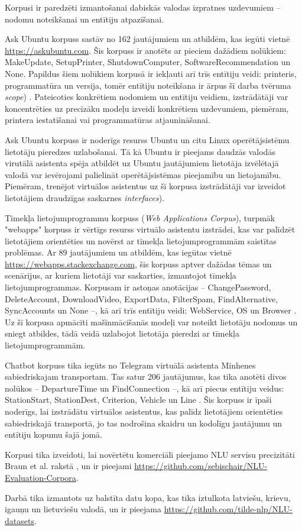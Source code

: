 Korpusi ir paredzēti izmantošanai dabiskās valodas izpratnes uzdevumiem -- nodomu noteikšanai un entītiju atpazīšanai.

Ask Ubuntu korpuss sastāv no 162 jautājumiem un atbildēm, kas iegūti vietnē \url{https://askubuntu.com}. Šis korpuss ir anotēts ar pieciem dažādiem nolūkiem: MakeUpdate, SetupPrinter, ShutdownComputer, SoftwareRecommendation un None. Papildus šiem nolūkiem korpusā ir iekļauti arī trīs entītiju veidi: printeris, programmatūra un versija, tomēr entītiju noteikšana ir ārpus šī darba tvēruma \textit{scope}) \cite{braun-2017}. Pateicoties konkrētiem nodomiem un entītiju veidiem, izstrādātāji var koncentrēties uz precīzāku modeļu izveidi konkrētiem uzdevumiem, piemēram, printera iestatīšanai vai programmatūras atjaunināšanai.

Ask Ubuntu korpuss ir noderīgs resurss Ubuntu un citu Linux operētājsistēmu lietotāju pieredzes uzlabošanai. Tā kā Ubuntu ir pieejams daudzās valodās virutālā asistenta spēja atbildēt uz Ubuntu jautājumiem lietotāja izvēlētajā valodā var ievērojami palielināt operētājsistēmas pieejamību un lietojamību. Piemēram, trenējot virtuālos asistentus uz šī korpusa izstrādātāji var izveidot lietotājiem draudzīgas saskarnes \textit{interfaces}). 


Tīmekļa lietojumprogrammu korpuss (\textit{Web Applications Corpus}), turpmāk "webapps" korpuss ir vērtīgs resurss virtuālo asistentu izstrādei, kas var palīdzēt lietotājiem orientēties un novērst ar tīmekļa lietojumprogrammām saistītas problēmas. Ar 89 jautājumiem un atbildēm, kas iegūtas vietnē \url{https://webapps.stackexchange.com}, šis korpuss aptver dažādas tēmas un scenārijus, ar kuriem lietotāji var saskarties, izmantojot tīmekļa lietojumprogrammas. Korpusam ir astoņas anotācijas -- ChangePassword, DeleteAccount, DownloadVideo, ExportData, FilterSpam, FindAlternative, SyncAccounts un None --, kā arī trīs entītiju veidi: WebService, OS un Browser \cite{braun-2017}. Uz šī korpusa apmācīti mašīnmācīšanās modeļi var noteikt lietotāju nodomus un sniegt atbildes, tādā veidā uzlabojot lietotāja pieredzi ar tīmekļa lietojumprogrammām.



Chatbot korpuss tika iegūts no Telegram virtuālā asistenta Minhenes sabiedriskajam transportam. Tas satur 206 jautājumus, kas tika anotēti divos nolūkos -- DepartureTime un FindConnection --, kā arī piecus entītiju veidus: StationStart, StationDest, Criterion, Vehicle un Line \cite{braun-2017}. Šis korpuss ir īpaši noderīgs, lai izstrādātu virtuālos asistentus, kas palīdz lietotājiem orientēties sabiedriskajā transportā, jo tas nodrošina skaidru un kodolīgu jautājumu un entītiju kopumu šajā jomā. 



Korpusi tika izveidoti, lai novērtētu komerciāli pieejamo NLU servisu precizitāti Braun et al. rakstā \cite{braun-2017}, un ir pieejami \url{https://github.com/sebischair/NLU-Evaluation-Corpora}. 


Darbā tika izmantots uz \cite{braun-2017} balstīta datu kopa, kas tika iztulkota latviešu, krievu, igauņu un lietuviešu valodā, un ir pieejama \url{https://github.com/tilde-nlp/NLU-datasets}.

